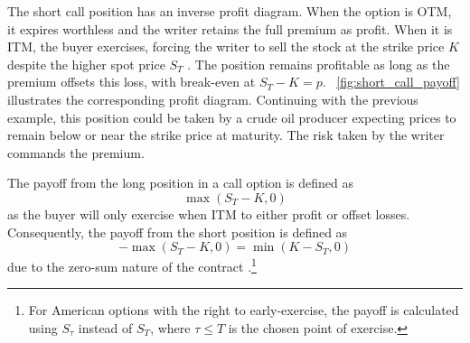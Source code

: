 \documentclass[english,12pt,a4paper,pdftex,sci,utf8]{aaltothesis}
\begin{document}
The short call position has an inverse profit diagram. When the option is OTM, it expires worthless and the writer retains the full premium as profit. When it is ITM, the buyer exercises, forcing the writer to sell the stock at the strike price $K$ despite the higher spot price $S_T$ \cite{hull2013fundamentals}. The position remains profitable as long as the premium offsets this loss, with break-even at $S_T - K = p$. ~\cref{fig:short_call_payoff} illustrates the corresponding profit diagram. Continuing with the previous example, this position could be taken by a crude oil producer expecting prices to remain below or near the strike price at maturity. The risk taken by the writer commands the premium.

The payoff from the long position in a call option is defined as
\begin{equation}
    \max(S_T-K,0)
\label{eq:long_call_payoff}
\end{equation}
as the buyer will only exercise when ITM to either profit or offset losses. Consequently, the payoff from the short position is defined as 
\begin{equation*}
    -\max(S_T-K,0) = \min(K-S_T,0)
\end{equation*}
due to the zero-sum nature of the contract \cite{hull2016options}.\footnote{For American options with the right to early-exercise, the payoff is calculated using $S_\tau$ instead of $S_T$, where $\tau \le T$ is the chosen point of exercise.}
\end{document}
